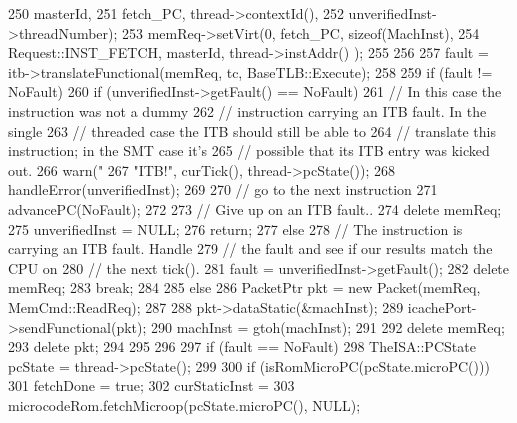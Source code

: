 \begin{DoxyCode}
{{{{250                                      masterId,
251                                      fetch_PC, thread->contextId(),
252                                      unverifiedInst->threadNumber);
253                 memReq->setVirt(0, fetch_PC, sizeof(MachInst),
254                                 Request::INST_FETCH, masterId, thread->instAddr()
      );
255 
256 
257                 fault = itb->translateFunctional(memReq, tc, BaseTLB::Execute);
258 
259                 if (fault != NoFault) {
260                     if (unverifiedInst->getFault() == NoFault) {
261                         // In this case the instruction was not a dummy
262                         // instruction carrying an ITB fault.  In the single
263                         // threaded case the ITB should still be able to
264                         // translate this instruction; in the SMT case it's
265                         // possible that its ITB entry was kicked out.
266                         warn("%
267                              "ITB!", curTick(), thread->pcState());
268                         handleError(unverifiedInst);
269 
270                         // go to the next instruction
271                         advancePC(NoFault);
272 
273                         // Give up on an ITB fault..
274                         delete memReq;
275                         unverifiedInst = NULL;
276                         return;
277                     } else {
278                         // The instruction is carrying an ITB fault.  Handle
279                         // the fault and see if our results match the CPU on
280                         // the next tick().
281                         fault = unverifiedInst->getFault();
282                         delete memReq;
283                         break;
284                     }
285                 } else {
286                     PacketPtr pkt = new Packet(memReq, MemCmd::ReadReq);
287 
288                     pkt->dataStatic(&machInst);
289                     icachePort->sendFunctional(pkt);
290                     machInst = gtoh(machInst);
291 
292                     delete memReq;
293                     delete pkt;
294                 }
295             }
296 
297             if (fault == NoFault) {
298                 TheISA::PCState pcState = thread->pcState();
299 
300                 if (isRomMicroPC(pcState.microPC())) {
301                     fetchDone = true;
302                     curStaticInst =
303                         microcodeRom.fetchMicroop(pcState.microPC(), NULL);
}}}}}
\end{DoxyCode}
